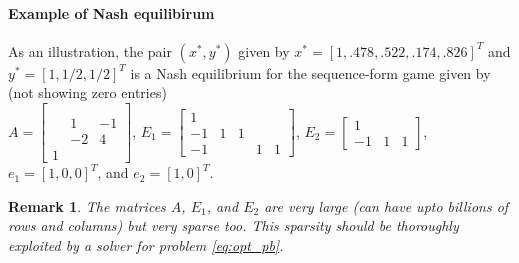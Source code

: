 \documentclass{article} %
\newtheorem{remark}{Remark}
\begin{document}

\paragraph{Example of Nash equilibirum}
As an illustration, the pair $(x^*, y^*)$ given by
$x^* = [1, .478, .522, .174, .826]^T$ and
$y^* = [1, 1/2, 1/2]^T$ is a Nash equilibrium for the sequence-form game given by (not showing zero entries)\\
$A = \left[\begin{array}{ccc}
  &   &  \\
  &   &  \\
  & 1 & -1\\
  & -2 & 4\\
1 &   &  
\end{array}\right]$, $E_1 = \left[\begin{array}{ccccc}
  1 &   &   &   &  \\
  -1 & 1 & 1 &   &  \\
  -1 &   &   & 1 & 1
\end{array}\right]$,
$E_2 = \left[\begin{array}{ccc}
  1 &   &  \\
  -1 & 1 & 1
\end{array}\right]$, $e_1 = [1, 0, 0]^T$, and $e_2 = [1, 0]^T$.

\begin{remark}
  The matrices $A$, $E_1$, and $E_2$ are very large (can have upto billions of rows and columns) but very sparse too.
This sparsity should be thoroughly exploited by a solver for problem \eqref{eq:opt_pb}.
\end{remark}
\end{document}
